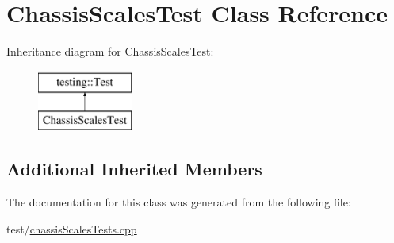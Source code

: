\hypertarget{classChassisScalesTest}{}\section{Chassis\+Scales\+Test Class Reference}
\label{classChassisScalesTest}
Inheritance diagram for Chassis\+Scales\+Test\+:\begin{figure}[H]
\begin{center}
\leavevmode
\includegraphics[height=2.000000cm]{classChassisScalesTest}
\end{center}
\end{figure}
\subsection*{Additional Inherited Members}


The documentation for this class was generated from the following file\+:\begin{DoxyCompactItemize}
\item 
test/\mbox{\hyperlink{chassisScalesTests_8cpp}{chassis\+Scales\+Tests.\+cpp}}\end{DoxyCompactItemize}
